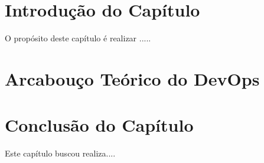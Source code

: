 \vspace{-2cm}
\section{Introdução do Capítulo}
O propósito deste capítulo é realizar .....

\section{Arcabouço Teórico do DevOps}


\section{Conclusão do Capítulo}
Este capítulo buscou realiza....